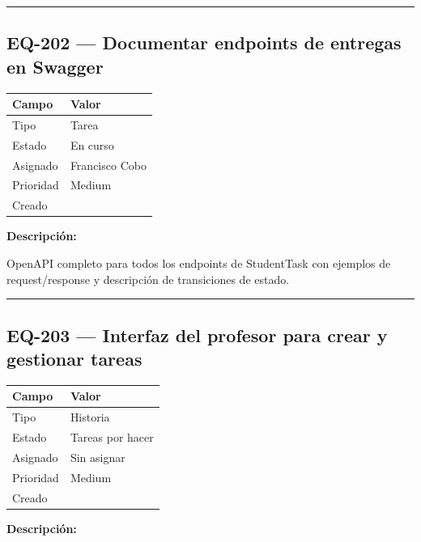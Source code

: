 \documentclass[
  spanish,
  11pt,
]{report}
\newcounter{none} %
\begin{document}
\begin{center}\rule{0.5\linewidth}{0.5pt}\end{center}

\subsection{EQ-202 --- Documentar endpoints de entregas en
Swagger}\label{eq-202-documentar-endpoints-de-entregas-en-swagger}

{\def\LTcaptype{none} %
\begin{longtable}[]{@{}ll@{}}
\toprule\noalign{}
Campo & Valor \\
\midrule\noalign{}
\endhead
\bottomrule\noalign{}
\endlastfoot
Tipo & Tarea \\
Estado & En curso \\
Asignado & Francisco Cobo \\
Prioridad & Medium \\
Creado & \\
\end{longtable}
}

\textbf{Descripción:}

OpenAPI completo para todos los endpoints de StudentTask con ejemplos de
request/response y descripción de transiciones de estado.

\begin{center}\rule{0.5\linewidth}{0.5pt}\end{center}

\subsection{EQ-203 --- Interfaz del profesor para crear y gestionar
tareas}\label{eq-203-interfaz-del-profesor-para-crear-y-gestionar-tareas}

{\def\LTcaptype{none} %
\begin{longtable}[]{@{}ll@{}}
\toprule\noalign{}
Campo & Valor \\
\midrule\noalign{}
\endhead
\bottomrule\noalign{}
\endlastfoot
Tipo & Historia \\
Estado & Tareas por hacer \\
Asignado & Sin asignar \\
Prioridad & Medium \\
Creado & \\
\end{longtable}
}

\textbf{Descripción:}
\end{document}
